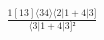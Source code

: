 \documentclass[varwidth, border=5pt]{standalone}
\begin{document}
\begin{my}
$\begin{gathered}
\scriptscriptstyle\frac{1[13]⟨34⟩⟨2|1+4|3]}{⟨3|1+4|3]²}
\end{gathered}$
\end{my}
\end{document}
